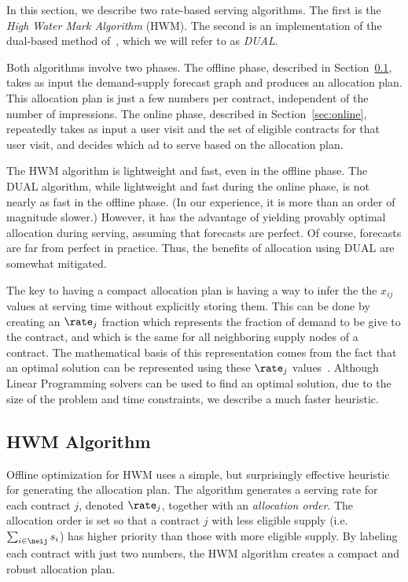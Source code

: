 
In this section, we describe two rate-based serving algorithms.  The
first is the {\em High Water Mark Algorithm} (HWM).  The second is
an implementation of the dual-based method of~\cite{EC}, which we
will refer to as {\em DUAL}.

Both algorithms involve two phases. The offline phase, described in
Section~\ref{sec:offline}, takes as input the demand-supply forecast
graph and produces an allocation plan.  This allocation plan is just
a few numbers per contract, independent of the number of
impressions.
The online phase, described in
Section~\ref{sec:online}, repeatedly takes as input a user visit and
the set of eligible contracts for that user visit, and decides which
ad to serve based on the allocation plan.

The HWM algorithm is lightweight and fast, even in the offline
phase.  The DUAL algorithm, while lightweight and fast during the
online phase, is not nearly as fast in the offline phase.  (In our
experience, it is more than an order of magnitude slower.)  However,
it has the advantage of yielding provably optimal allocation during
serving, assuming that forecasts are perfect.  Of course, forecasts
are far from perfect in practice.  Thus, the benefits of allocation
using DUAL are somewhat mitigated.


The key to having a compact allocation plan is having a way to infer the the $x_{ij}$
values at serving time without explicitly storing them.  This can be done by creating
an $\rate_j$ fraction which represents the fraction of demand to be give to the contract,
and  which is the same for all neighboring supply nodes of a contract.  The mathematical basis
of this representation comes from the fact that an optimal solution can be represented
using these $\rate_j$ values~\cite{EC}.  Although Linear Programming solvers can be
used to find an optimal solution, due to the size of the problem and time constraints,
we describe a much faster heuristic.

\subsection{HWM Algorithm}
\label{sec:offline} Offline optimization for HWM uses a simple, but
surprisingly effective heuristic for generating
the allocation plan.
The algorithm generates a serving rate for each contract $j$, denoted $\rate_j$, together with an
{\em allocation order}.  The allocation order is set so that a contract $j$ with less eligible supply (i.e.
$\sum_{i\in\neij} s_i$) has higher priority than those with more eligible supply.  By labeling each
contract with just two numbers, the HWM algorithm creates a compact and robust allocation plan.

